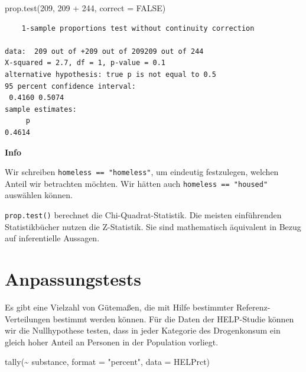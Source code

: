 \documentclass[
  ngerman,
]{scrbook}
\newenvironment{Shaded}{\begin{snugshade}}{\end{snugshade}}
\newcommand{\AttributeTok}[1]{\textcolor[rgb]{0.77,0.63,0.00}{#1}}
\newcommand{\ConstantTok}[1]{\textcolor[rgb]{0.00,0.00,0.00}{#1}}
\newcommand{\DecValTok}[1]{\textcolor[rgb]{0.00,0.00,0.81}{#1}}
\newcommand{\FunctionTok}[1]{\textcolor[rgb]{0.00,0.00,0.00}{#1}}
\newcommand{\NormalTok}[1]{#1}
\newcommand{\SpecialCharTok}[1]{\textcolor[rgb]{0.00,0.00,0.00}{#1}}
\newcommand{\StringTok}[1]{\textcolor[rgb]{0.31,0.60,0.02}{#1}}
\newenvironment{infobox}[1]
  {
  \begin{itemize}
  \renewcommand{\labelitemi}{
    \raisebox{1.8\height}[0pt][0pt]{
       {\setkeys{Gin}{width=7em,keepaspectratio}
        {\Large \textcolor{dark-fom-green}\faLightbulbO}}
        }
  }
  \begin{blackbox}
        \bgroup\color{dark-fom-green}
          {\textbf{Info}}
        \egroup
  \item
  }
  {
  \end{blackbox}
  \end{itemize}
  }
\begin{document}
\begin{Shaded}
\begin{Highlighting}[]
\FunctionTok{prop.test}\NormalTok{(}\DecValTok{209}\NormalTok{, }\DecValTok{209} \SpecialCharTok{+} \DecValTok{244}\NormalTok{, }\AttributeTok{correct =} \ConstantTok{FALSE}\NormalTok{)}
\end{Highlighting}
\end{Shaded}

\begin{verbatim}
    1-sample proportions test without continuity correction

data:  209 out of +209 out of 209209 out of 244
X-squared = 2.7, df = 1, p-value = 0.1
alternative hypothesis: true p is not equal to 0.5
95 percent confidence interval:
 0.4160 0.5074
sample estimates:
     p 
0.4614 
\end{verbatim}

\begin{infobox}{infobox}
Wir schreiben \texttt{homeless\ ==\ "homeless"}, um eindeutig festzulegen, welchen Anteil wir betrachten möchten. Wir hätten auch \texttt{homeless\ ==\ "housed"} auswählen können.

\texttt{prop.test()} berechnet die Chi-Quadrat-Statistik. Die meisten einführenden Statistikbücher nutzen die Z-Statistik. Sie sind mathematisch äquivalent in Bezug auf inferentielle Aussagen.

\end{infobox}

\hypertarget{anpassungstests}{%
\section{Anpassungstests}\label{anpassungstests}}

Es gibt eine Vielzahl von Gütemaßen, die mit Hilfe bestimmter Referenz-Verteilungen bestimmt werden können. Für die Daten der HELP-Studie können wir die Nullhypothese testen, dass in jeder Kategorie des Drogenkonsum ein gleich hoher Anteil an Personen in der Population vorliegt.

\begin{Shaded}
\begin{Highlighting}[]
\FunctionTok{tally}\NormalTok{(}\SpecialCharTok{\textasciitilde{}}\NormalTok{ substance, }\AttributeTok{format =} \StringTok{"percent"}\NormalTok{, }
      \AttributeTok{data =}\NormalTok{ HELPrct)}
\end{Highlighting}
\end{Shaded}
\end{document}

